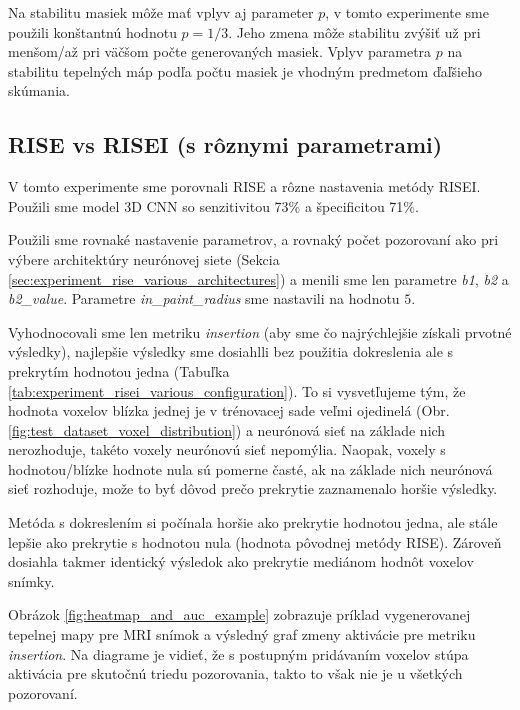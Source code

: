 Na stabilitu masiek môže mať vplyv aj parameter $p$, v tomto experimente sme použili konštantnú hodnotu $p = 1/3$. Jeho zmena môže stabilitu zvýšiť už pri menšom/až pri väčšom počte generovaných masiek. Vplyv parametra $p$ na stabilitu tepelných máp podľa počtu masiek je vhodným predmetom ďaľšieho skúmania.

\subsection{RISE vs RISEI (s rôznymi parametrami)}

V tomto experimente sme porovnali RISE a rôzne nastavenia metódy RISEI. Použili sme model 3D CNN so senzitivitou 73\% a špecificitou 71\%.

Použili sme rovnaké nastavenie parametrov, a rovnaký počet pozorovaní ako pri výbere architektúry neurónovej siete (Sekcia \ref{sec:experiment_rise_various_architectures}) a menili sme len parametre \textit{b1}, \textit{b2} a \textit{b2\_value}. Parametre \textit{in\_paint\_radius} sme nastavili na hodnotu $5$. 

Vyhodnocovali sme len metriku \textit{insertion} (aby sme čo najrýchlejšie získali prvotné výsledky), najlepšie výsledky sme dosiahlli bez použitia dokreslenia ale s prekrytím hodnotou jedna (Tabuľka \ref{tab:experiment_risei_various_configuration}). To si vysvetľujeme tým, že hodnota voxelov blízka jednej je v trénovacej sade veľmi ojedinelá (Obr. \ref{fig:test_dataset_voxel_distribution}) a neurónová sieť na základe nich nerozhoduje, takéto voxely neurónovú sieť nepomýlia. Naopak, voxely s hodnotou/blízke hodnote nula sú pomerne časté, ak na základe nich neurónová sieť rozhoduje, može to byť dôvod prečo prekrytie zaznamenalo horšie výsledky.

Metóda s dokreslením si počínala horšie ako prekrytie hodnotou jedna, ale stále lepšie ako prekrytie s hodnotou nula (hodnota pôvodnej metódy RISE). Zároveň dosiahla takmer identický výsledok ako prekrytie mediánom hodnôt voxelov snímky.

Obrázok \ref{fig:heatmap_and_auc_example} zobrazuje príklad vygenerovanej tepelnej mapy pre MRI snímok a výsledný graf zmeny aktivácie pre metriku \textit{insertion}. Na diagrame je vidieť, že s postupným pridávaním voxelov stúpa aktivácia pre skutočnú triedu pozorovania, takto to však nie je u všetkých pozorovaní.

